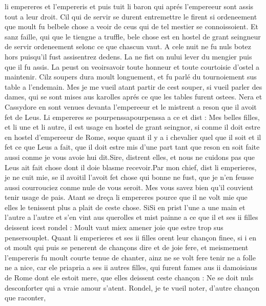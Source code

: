 \documentclass{article}
\begin{document}
\begin{pages}
   li empereres et l’empereris
   et puis tuit li baron qui aprés l’empereeur sont assis tout a leur droit. 
   Cil qui de servir se durent entremettre le firent si ordeneement que moult fu 
   belbele chose a veoir de ceus qui de tel mestier se connoissoient. 
   Et sanz faille, qui que le tiengne a truffle, bele chose est en hostel de grant seingneur de servir ordeneement selonc ce que chascun vaut. \pend
\pstart A cele nuit ne fu nuls botez hors puisqu’il fust 
   assisentrez dedens. La ne fist on nului lever du mengier puis que il fu assis. 
   La peust on veoirsavoir toute honneur et toute courtoisie d’ostel a maintenir. 
   Cilz soupers dura moult longuement, et fu parlé du tournoiement sus table a l’endemain. 
   Mes je me vueil atant partir de cest souper, si vueil parler des dames,
   qui se sont mises aus karolles aprés ce que les tables furent ostees. Nera et 
   Cassydore en sont venues 
   devanta 
   l’empereeur et le mistrent a reson que il avoit fet de Leus.
   Li empereres se 
   pourpenssapourpenssa a ce et dist :
   Mes belles filles, et li une et li autre, 
      il est usage en hostel de grant seingnor, si conme il doit estre en hostel 
      d’empereeur de Rome, seque quant 
      il y a i chevalier quel que il soit et il fet ce que Leus a fait,
      que il doit estre mis d’une part tant que reson en soit faite aussi conme je 
      vous avoie hui dit.Sire, distrent elles, et nous ne cuidons pas que Leus
      ait fait chose dont il doie blasme recevoir.Par mon chief, dist li emperieres, je ne cuit mie,
      se il avoitil l'avoit fet 
      chose
      qui bonne ne fust, 
      que je n’en feusse aussi courrouciez conme nule de vous seroit. Mes vous savez bien qu’il couvient tenir usage de pais.
   Atant se dreça li empereres pource que il ne volt mie
   que elles le tenissent plus a plait de ceste chose.
   SiSi en prist l’une a une main 
   et l’autre a l’autre et s’en vint aus querolles et mist painne a ce que il 
   et ses ii filles deissent icest rondel :
   Moult vaut miex amener joie que estre trop 
   sus pensersouplet. \pend
\pstart Quant li emperieres et ses ii filles 
   orent leur chançon finee, si i en ot moult qui puis se penerent de chançons dire et de joie fere,
   et meismement l’empereris fu moult courte tenue de chanter,
   ainz ne se volt fere tenir ne a folle ne a nice, car ele priapria a ses 
   ii autres filles, qui furent fames aus 
   ii damoisiaus de Rome 
   dont ele estoit mere, que elles deissent ceste chançon :
   Ne se doit nuls desconforter qui a vraie amour s’atent. 
      Rondel, je te vueil noter, d’autre chançon que raconter,

\end{pages}
\end{document}
